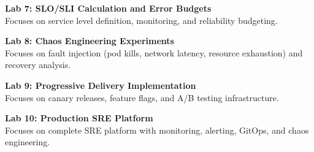 \vspace{0.2cm}

\noindent\textbf{Lab 7: SLO/SLI Calculation and Error Budgets} \\
Focuses on service level definition, monitoring, and reliability budgeting.

\vspace{0.2cm}

\noindent\textbf{Lab 8: Chaos Engineering Experiments} \\
Focuses on fault injection (pod kills, network latency, resource exhaustion) and recovery analysis.

\vspace{0.2cm}

\noindent\textbf{Lab 9: Progressive Delivery Implementation} \\
Focuses on canary releases, feature flags, and A/B testing infrastructure.

\vspace{0.2cm}

\noindent\textbf{Lab 10: Production SRE Platform} \\
Focuses on complete SRE platform with monitoring, alerting, GitOps, and chaos engineering.

\vspace{0.2cm}

\newpage
{}
